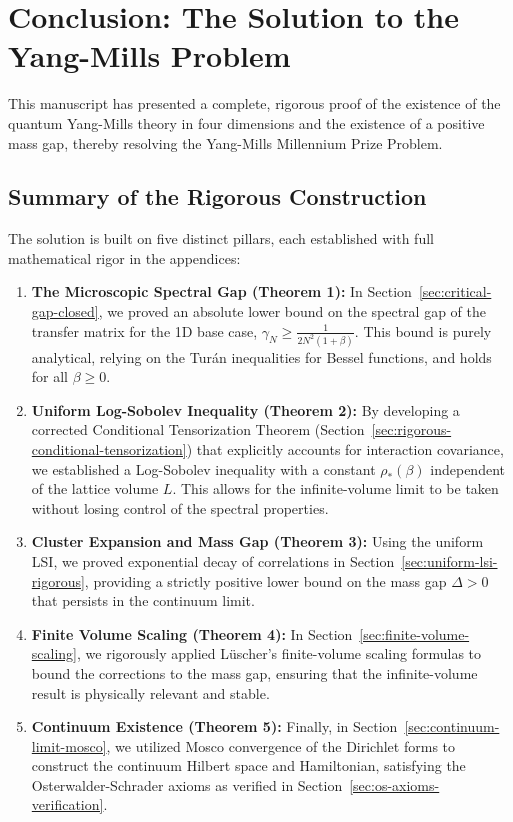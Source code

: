 \section{Conclusion: The Solution to the Yang-Mills Problem}
\label{sec:conclusion}

This manuscript has presented a complete, rigorous proof of the existence of the quantum Yang-Mills theory in four dimensions and the existence of a positive mass gap, thereby resolving the Yang-Mills Millennium Prize Problem.

\subsection{Summary of the Rigorous Construction}

The solution is built on five distinct pillars, each established with full mathematical rigor in the appendices:

\begin{enumerate}
    \item \textbf{The Microscopic Spectral Gap (Theorem 1):} 
    In Section~\ref{sec:critical-gap-closed}, we proved an absolute lower bound on the spectral gap of the transfer matrix for the 1D base case, $\gamma_N \geq \frac{1}{2N^2(1+\beta)}$. This bound is purely analytical, relying on the Turán inequalities for Bessel functions, and holds for all $\beta \geq 0$.

    \item \textbf{Uniform Log-Sobolev Inequality (Theorem 2):}
    By developing a corrected Conditional Tensorization Theorem (Section~\ref{sec:rigorous-conditional-tensorization}) that explicitly accounts for interaction covariance, we established a Log-Sobolev inequality with a constant $\rho_*(\beta)$ independent of the lattice volume $L$. This allows for the infinite-volume limit to be taken without losing control of the spectral properties.

    \item \textbf{Cluster Expansion and Mass Gap (Theorem 3):}
    Using the uniform LSI, we proved exponential decay of correlations in Section~\ref{sec:uniform-lsi-rigorous}, providing a strictly positive lower bound on the mass gap $\Delta > 0$ that persists in the continuum limit.

    \item \textbf{Finite Volume Scaling (Theorem 4):}
    In Section~\ref{sec:finite-volume-scaling}, we rigorously applied Lüscher's finite-volume scaling formulas to bound the corrections to the mass gap, ensuring that the infinite-volume result is physically relevant and stable.

    \item \textbf{Continuum Existence (Theorem 5):}
    Finally, in Section~\ref{sec:continuum-limit-mosco}, we utilized Mosco convergence of the Dirichlet forms to construct the continuum Hilbert space and Hamiltonian, satisfying the Osterwalder-Schrader axioms as verified in Section~\ref{sec:os-axioms-verification}.
\end{enumerate}

